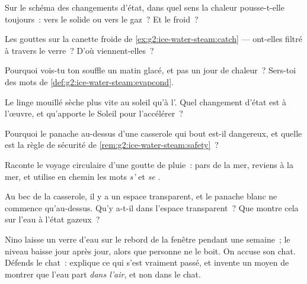 \begin{exercise}[$\star$]\label{exo:g2:ice-water-steam:3}
Sur le schéma des changements d'état, dans quel sens la chaleur
pousse-t-elle toujours~: vers le solide ou vers le gaz~? Et le
froid~?
\end{exercise}

\begin{exercise}[$\star$]\label{exo:g2:ice-water-steam:4}
Les gouttes sur la canette froide de
\cref{ex:g2:ice-water-steam:catch} --- ont-elles filtré à travers le
verre~? D'où viennent-elles~?
\end{exercise}

\begin{exercise}[$\star$]\label{exo:g2:ice-water-steam:5}
Pourquoi vois-tu ton souffle un matin glacé, et pas un jour de
chaleur~? Sers-toi des mots de
\cref{def:g2:ice-water-steam:evapcond}.
\end{exercise}

\begin{exercise}[$\star$]\label{exo:g2:ice-water-steam:6}
Le linge mouillé sèche plus vite au soleil qu'à l'. Quel
changement d'état est à l'œuvre, et qu'apporte le Soleil pour
l'accélérer~?
\end{exercise}

\begin{exercise}[$\star$]\label{exo:g2:ice-water-steam:7}
Pourquoi le panache au-dessus d'une casserole qui bout est-il
dangereux, et quelle est la règle de sécurité de
\cref{rem:g2:ice-water-steam:safety}~?
\end{exercise}

\begin{exercise}[$\star$]\label{exo:g2:ice-water-steam:8}
Raconte le voyage circulaire d'une goutte de pluie~: pars de la mer,
reviens à la mer, et utilise en chemin les mots
\emph{s'} et \emph{se }.
\end{exercise}

\begin{exercise}[$\star\star$]\label{exo:g2:ice-water-steam:9}
Au bec de la casserole, il y a un espace transparent, et le panache
blanc ne commence qu'au-dessus. Qu'y a-t-il dans l'espace
transparent~? Que montre cela sur l'eau à l'état gazeux~?
\end{exercise}

\begin{exercise}[$\star\star$]\label{exo:g2:ice-water-steam:10}
Nino laisse un verre d'eau sur le rebord de la fenêtre pendant une
semaine~; le niveau baisse jour après jour, alors que personne ne le
boit. On accuse son chat. Défends le chat~: explique ce qui s'est
vraiment passé, et invente un moyen de montrer que l'eau part
\emph{dans l'air}, et non dans le chat.
\end{exercise}
